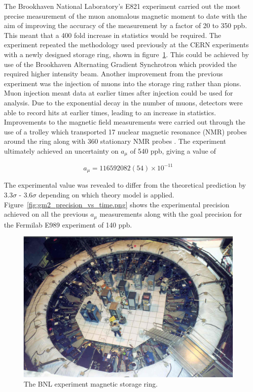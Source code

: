 The Brookhaven National Laboratory's E821 experiment carried out the most precise measurement of the muon anomalous magnetic moment to date with the aim of improving the accuracy of the measurement by a factor of 20 to 350 ppb. This meant that a 400 fold increase in statistics would be required. The experiment repeated the methodology used previously at the CERN experiments with a newly designed storage ring, shown in figure~\ref{fig:bnl}. This could be achieved by use of the Brookhaven Alternating Gradient Synchrotron \cite{Reference10} which provided the required higher intensity beam. Another improvement from the previous experiment was the injection of muons into the storage ring rather than pions. Muon injection meant data at earlier times after injection could be used for analysis. Due to the exponential decay in the number of muons, detectors were able to record hits at earlier times, leading to an increase in statistics. Improvements to the magnetic field measurements were carried out through the use of a trolley which transported 17 nuclear magnetic resonance (NMR) probes around the ring along with 360 stationary NMR probes \cite{Reference10}. 
The experiment ultimately achieved an uncertainty on $a_{\mu}$ of 540 ppb, giving a value of \cite{Reference13}\cite{Reference14}

\begin{equation}
a_{\mu} = 116 592 082(54){\times}10^{-11}
\end{equation}

The experimental value was revealed to differ from the theoretical prediction by 3.3$\sigma$ - 3.6$\sigma$ depending on which theory model is applied. Figure~\ref{fig:gm2_precision_vs_time.png} shows the experimental precision achieved on all the previous $a_{\mu}$ measurements along with the goal precision for the Fermilab E989 experiment of 140 ppb. 

\begin{figure}[th]
\centering
\includegraphics[scale=0.7]{Figures/bnl}
\decoRule
\caption{The BNL experiment magnetic storage ring.}
\label{fig:bnl}
\end{figure}

